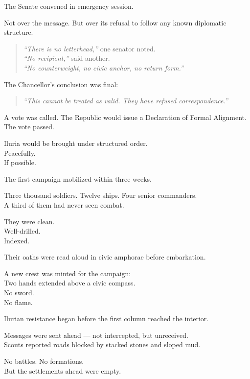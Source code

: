 \documentclass[12pt]{article}
\begin{document}
The Senate convened in emergency session.

Not over the message. But over its refusal to follow any known diplomatic structure.

\begin{quote}
\textit{“There is no letterhead,”} one senator noted.\\
\textit{“No recipient,”} said another.\\
\textit{“No counterweight, no civic anchor, no return form.”}
\end{quote}

The Chancellor’s conclusion was final:

\begin{quote}
\textit{“This cannot be treated as valid. They have refused correspondence.”}
\end{quote}

A vote was called. The Republic would issue a Declaration of Formal Alignment. The vote passed.

Iluria would be brought under structured order.\\
Peacefully.\\
If possible.

\vspace{1em}

The first campaign mobilized within three weeks.

Three thousand soldiers. Twelve ships. Four senior commanders.\\
A third of them had never seen combat.

They were clean.\\
Well-drilled.\\
Indexed.

Their oaths were read aloud in civic amphorae before embarkation.

A new crest was minted for the campaign:\\
Two hands extended above a civic compass.\\
No sword.\\
No flame.

\vspace{1em}

Ilurian resistance began before the first column reached the interior.

Messages were sent ahead --- not intercepted, but unreceived.\\
Scouts reported roads blocked by stacked stones and sloped mud.

No battles. No formations.\\
But the settlements ahead were empty.
\end{document}

